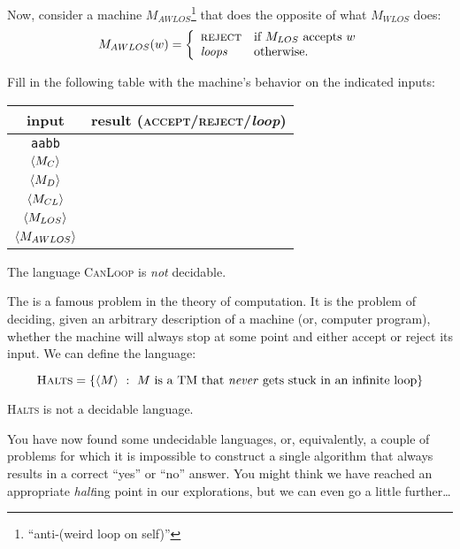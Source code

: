 \documentclass[twoside,letterpaper,openany]{book}
\begin{document}
\begin{exer3}
Now, consider a machine $M_{AWLOS}$\footnote{``anti-(weird loop on self)''} that does the opposite of what $M_{WLOS}$ does:
\[ M_{AWLOS}(w) = \bigg\{
\begin{array}{ll}
\textsc{reject} &  \textrm{if $M_{LOS}$ accepts $w$} \\
\textit{loops} & \textrm{otherwise.}
\end{array}
\]

Fill in the following table with the machine's behavior on the indicated inputs:
\begin{center}
\renewcommand{\arraystretch}{1.25}
\begin{tabular}[c]{c|c}
input & result (\textsc{accept}/\textsc{reject}/\textit{loop}) \\\hline
\texttt{aabb} & \\
${\langle{M_{C}}\rangle}$ & \\
${\langle{M_{D}}\rangle}$ & \\
${\langle{M_{CL}}\rangle}$ & \\
${\langle{M_{LOS}}\rangle}$ & \\
${\langle{M_{AWLOS}}\rangle}$ & \\
\end{tabular}
\end{center}
\end{exer3}

\begin{stmt3}
The language \textsc{CanLoop} is \emph{not} decidable.
\end{stmt3}

\begin{discussion}
The  is a famous problem in the theory of computation. It is the problem of deciding, given an arbitrary description of a machine (or, computer program), whether the machine will always stop at some point and either accept or reject its input. We can define the language:

\[ \textsc{Halts} = \left\lbrace {\langle{M}\rangle}\ :\ M~\textrm{is a TM that \emph{never} gets stuck in an infinite loop} \right\rbrace \]
\end{discussion}

\begin{stmt3}
\textsc{Halts} is not a decidable language.
\end{stmt3}

\begin{discussion}
You have now found some undecidable languages, or, equivalently, a couple of problems for which it is impossible to construct a single algorithm that always results in a correct ``yes'' or ``no'' answer. 
You might think we have reached an appropriate \emph{halt}ing point in our explorations, but we can even go a little further\ldots
\end{discussion}
\end{document}
